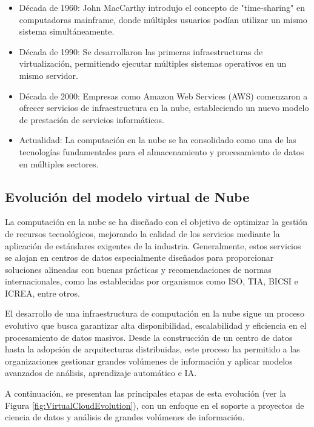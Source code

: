 {            \begin{itemize}
                \item D{\'e}cada de 1960: John MacCarthy introdujo el concepto de "time-sharing" en computadoras mainframe, donde m{\'u}ltiples usuarios pod{\'i}an utilizar un mismo sistema simult{\'a}neamente.
                \item D{\'e}cada de 1990: Se desarrollaron las primeras infraestructuras de virtualizaci{\'o}n, permitiendo ejecutar m{\'u}ltiples sistemas operativos en un mismo servidor.
                \item D{\'e}cada de 2000: Empresas como Amazon Web Services (AWS) comenzaron a ofrecer servicios de infraestructura en la nube, estableciendo un nuevo modelo de prestaci{\'o}n de servicios inform{\'a}ticos.
                \item Actualidad: La computaci{\'o}n en la nube se ha consolidado como una de las tecnolog{\'i}as fundamentales para el almacenamiento y procesamiento de datos en m{\'u}ltiples sectores.
            \end{itemize}

        \subsection{Evoluci{\'o}n del modelo virtual de Nube}
            La computaci{\'o}n en la nube se ha diseñado con el objetivo de optimizar la gesti{\'o}n de recursos tecnol{\'o}gicos, mejorando la calidad de los servicios mediante la aplicaci{\'o}n de est{\'a}ndares exigentes de la industria. Generalmente, estos servicios se alojan en centros de datos especialmente diseñados para proporcionar soluciones alineadas con buenas pr{\'a}cticas y recomendaciones de normas internacionales, como las establecidas por organismos como ISO, TIA, BICSI e ICREA, entre otros.

            El desarrollo de una infraestructura de computaci{\'o}n en la nube sigue un proceso evolutivo que busca garantizar alta disponibilidad, escalabilidad y eficiencia en el procesamiento de datos masivos. Desde la construcci{\'o}n de un centro de datos hasta la adopci{\'o}n de arquitecturas distribuidas, este proceso ha permitido a las organizaciones gestionar grandes vol{\'u}menes de informaci{\'o}n y aplicar modelos avanzados de an{\'a}lisis, aprendizaje autom{\'a}tico e IA.

            A continuaci{\'o}n, se presentan las principales etapas de esta evoluci{\'o}n (ver la Figura \ref{fig:VirtualCloudEvolution}), con un enfoque en el soporte a proyectos de ciencia de datos y an{\'a}lisis de grandes vol{\'u}menes de informaci{\'o}n.
            
}
